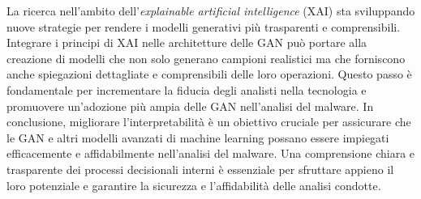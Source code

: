 La ricerca nell'ambito dell'\emph{explainable artificial intelligence} (XAI) sta sviluppando nuove strategie per rendere i modelli generativi più trasparenti e comprensibili. Integrare i principi di XAI nelle architetture delle GAN può portare alla creazione di modelli che non solo generano campioni realistici ma che forniscono anche spiegazioni dettagliate e comprensibili delle loro operazioni. Questo passo è fondamentale per incrementare la fiducia degli analisti nella tecnologia e promuovere un'adozione più ampia delle GAN nell'analisi del malware.
In conclusione, migliorare l'interpretabilità è un obiettivo cruciale per assicurare che le GAN e altri modelli avanzati di machine learning possano essere impiegati efficacemente e affidabilmente nell'analisi del malware. Una comprensione chiara e trasparente dei processi decisionali interni è essenziale per sfruttare appieno il loro potenziale e garantire la sicurezza e l'affidabilità delle analisi condotte. 